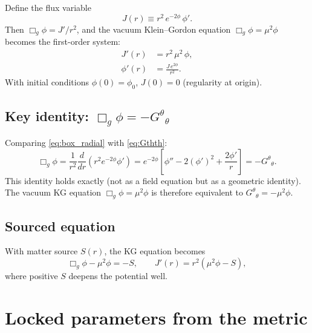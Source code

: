 \documentclass[11pt,letterpaper]{article}
\numberwithin{equation}{section}
\begin{document}
Define the flux variable
\begin{equation}
\label{eq:flux_def}
  J(r) \equiv r^2\,e^{-2\phi}\,\phi'.
\end{equation}
Then $\Box_g\phi = J'/r^2$, and the vacuum Klein--Gordon equation
$\Box_g\phi = \mu^2\phi$ becomes the first-order system:
\begin{equation}
\label{eq:flux_system}
\boxed{
\begin{aligned}
  J'(r) &= r^2\,\mu^2\,\phi, \\
  \phi'(r) &= \frac{J\,e^{2\phi}}{r^2}.
\end{aligned}
}
\end{equation}
With initial conditions $\phi(0) = \phi_0$, $J(0) = 0$ (regularity at origin).

\subsection{Key identity: $\Box_g\phi = -G^\theta{}_\theta$}

Comparing \eqref{eq:box_radial} with \eqref{eq:Gthth}:
\begin{equation}
\label{eq:box_gthth}
  \Box_g\phi = \frac{1}{r^2}\frac{d}{dr}\!\left(r^2 e^{-2\phi}\phi'\right)
  = e^{-2\phi}\!\left[\phi'' - 2(\phi')^2 + \frac{2\phi'}{r}\right]
  = -G^\theta{}_\theta.
\end{equation}
This identity holds exactly (not as a field equation but as a geometric
identity). The vacuum KG equation $\Box_g\phi = \mu^2\phi$ is therefore
equivalent to $G^\theta{}_\theta = -\mu^2\phi$.

\subsection{Sourced equation}

With matter source $S(r)$, the KG equation becomes
\begin{equation}
\label{eq:kg_sourced}
  \Box_g\phi - \mu^2\phi = -S, \qquad
  J'(r) = r^2\!\left(\mu^2\phi - S\right),
\end{equation}
where positive $S$ deepens the potential well.

\section{Locked parameters from the metric}
\label{sec:parameters}
\end{document}
